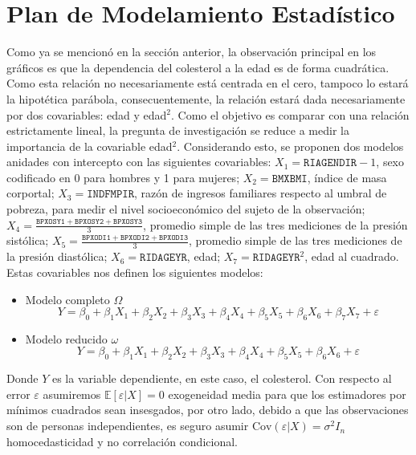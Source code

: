 \section{Plan de Modelamiento Estadístico}

Como ya se mencionó en la sección anterior, la observación principal en los gráficos es que la dependencia del colesterol a la edad es de forma cuadrática. Como esta relación no necesariamente está centrada en el cero, tampoco lo estará la hipotética parábola, consecuentemente, la relación estará dada necesariamente por dos covariables: edad y edad$^2$. Como  el objetivo es comparar con una relación estrictamente lineal, la pregunta de investigación se reduce a medir la importancia de la covariable edad$^2$. Considerando esto, se proponen dos modelos anidades con intercepto con las siguientes covariables: $X_1 = \texttt{RIAGENDIR} - 1$, sexo codificado en 0 para hombres y 1 para mujeres; $X_2 = \texttt{BMXBMI}$, índice de masa corportal; $X_3 = \texttt{INDFMPIR}$, razón de ingresos familiares respecto al umbral de pobreza, para medir el nivel socioeconómico del sujeto de la observación; $X_4 = \tfrac{\texttt{BPXOSY1} + \texttt{BPXOSY2} + \texttt{BPXOSY3}}{3}$, promedio simple de las tres mediciones de la presión sistólica; $X_5 = \tfrac{\texttt{BPXODI1} + \texttt{BPXODI2} + \texttt{BPXODI3}}{3}$, promedio simple de las tres mediciones de la presión diastólica; $X_6 = \texttt{RIDAGEYR}$, edad; $X_7 = \texttt{RIDAGEYR}^2$, edad al cuadrado. Estas covariables nos definen los siguientes modelos:

\begin{itemize}
    \item Modelo completo $\Omega$
    \begin{equation*}
        Y = \beta_0 + \beta_1 X_1 + \beta_2 X_2 + \beta_3 X_3 + \beta_4 X_4 + \beta_5 X_5 + \beta_6 X_6 + \beta_7 X_7 + \varepsilon
    \end{equation*}

    \item Modelo reducido $\omega$
    \begin{equation*}
        Y = \beta_0 + \beta_1 X_1 + \beta_2 X_2 + \beta_3 X_3 + \beta_4 X_4 + \beta_5 X_5 + \beta_6 X_6 + \varepsilon
    \end{equation*}
\end{itemize}

Donde $Y$ es la variable dependiente, en este caso, el colesterol. Con respecto al error $\varepsilon$ asumiremos $\mathbb{E}[\varepsilon | X] = 0$ exogeneidad media para que los estimadores por mínimos cuadrados sean insesgados, por otro lado, debido a que las observaciones son de personas independientes, es seguro asumir $\text{Cov}(\varepsilon | X) = \sigma^2 I_n$ homocedasticidad y no correlación condicional.

